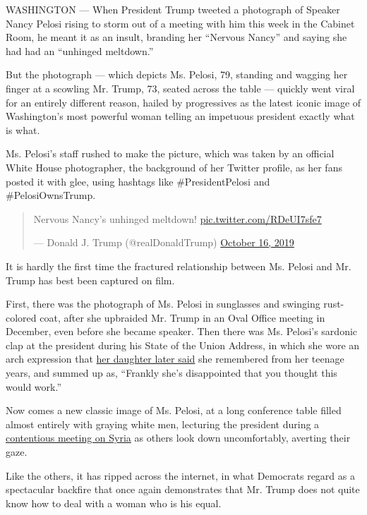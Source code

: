 WASHINGTON --- When President Trump tweeted a photograph of Speaker
Nancy Pelosi rising to storm out of a meeting with him this week in the
Cabinet Room, he meant it as an insult, branding her ``Nervous Nancy''
and saying she had had an ``unhinged meltdown.''

But the photograph --- which depicts Ms. Pelosi, 79, standing and
wagging her finger at a scowling Mr. Trump, 73, seated across the table
--- quickly went viral for an entirely different reason, hailed by
progressives as the latest iconic image of Washington's most powerful
woman telling an impetuous president exactly what is what.

Ms. Pelosi's staff rushed to make the picture, which was taken by an
official White House photographer, the background of her Twitter
profile, as her fans posted it with glee, using hashtags like
\#PresidentPelosi and \#PelosiOwnsTrump.

\begin{quote}
Nervous Nancy's unhinged meltdown!
\href{https://t.co/RDeUI7sfe7}{pic.twitter.com/RDeUI7sfe7}

--- Donald J. Trump (@realDonaldTrump)
\href{https://twitter.com/realDonaldTrump/status/1184597281808498688?ref_src=twsrc\%5Etfw}{October
16, 2019}
\end{quote}

It is hardly the first time the fractured relationship between Ms.
Pelosi and Mr. Trump has best been captured on film.

First, there was the photograph of Ms. Pelosi in sunglasses and swinging
rust-colored coat, after she upbraided Mr. Trump in an Oval Office
meeting in December, even before she became speaker. Then there was Ms.
Pelosi's sardonic clap at the president during his State of the Union
Address, in which she wore an arch expression that
\href{https://twitter.com/sfpelosi/status/1093178767642488832?s=20}{her
daughter later said} she remembered from her teenage years, and summed
up as, ``Frankly she's disappointed that you thought this would work.''

Now comes a new classic image of Ms. Pelosi, at a long conference table
filled almost entirely with graying white men, lecturing the president
during a
\href{https://www.nytimes.com/2019/10/16/us/politics/trump-pelosi-meeting.html}{contentious
meeting on Syria} as others look down uncomfortably, averting their
gaze.

Like the others, it has ripped across the internet, in what Democrats
regard as a spectacular backfire that once again demonstrates that Mr.
Trump does not quite know how to deal with a woman who is his equal.

